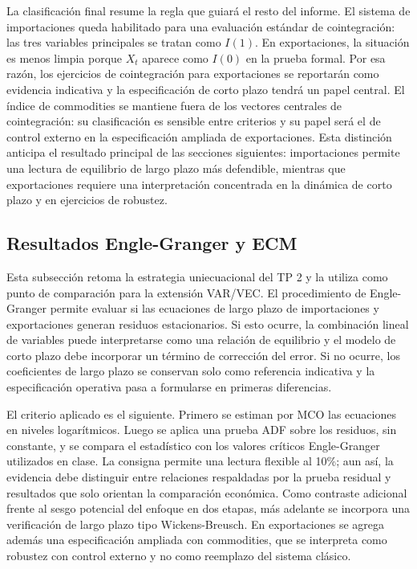 \documentclass[11pt,a4paper]{article}
\begin{document}
	La clasificación final resume la regla que guiará el resto del informe. El
	sistema de importaciones queda habilitado para una evaluación estándar de
	cointegración: las tres variables principales se tratan como \(I(1)\). En
	exportaciones, la situación es menos limpia porque \(X_t\) aparece como \(I(0)\)
	en la prueba formal. Por esa razón, los ejercicios de cointegración para
	exportaciones se reportarán como evidencia indicativa y la especificación de
	corto plazo tendrá un papel central. El índice de commodities se mantiene fuera
	de los vectores centrales de cointegración: su clasificación es sensible entre
	criterios y su papel será el de control externo en la especificación ampliada de
	exportaciones. Esta distinción anticipa el resultado principal de las secciones
	siguientes: importaciones permite una lectura de equilibrio de largo plazo más
	defendible, mientras que exportaciones requiere una interpretación concentrada
	en la dinámica de corto plazo y en ejercicios de robustez.
	
	\subsection{Resultados Engle-Granger y ECM}
	\label{subsec:resultados-eg-ecm}
	
	Esta subsección retoma la estrategia uniecuacional del TP 2 y la utiliza como
	punto de comparación para la extensión VAR/VEC. El procedimiento de
	Engle-Granger permite evaluar si las ecuaciones de largo plazo de importaciones
	y exportaciones generan residuos estacionarios. Si esto ocurre, la combinación
	lineal de variables puede interpretarse como una relación de equilibrio y el
	modelo de corto plazo debe incorporar un término de corrección del error. Si no
	ocurre, los coeficientes de largo plazo se conservan solo como referencia
	indicativa y la especificación operativa pasa a formularse en primeras
	diferencias.
	
	El criterio aplicado es el siguiente. Primero se estiman por MCO las ecuaciones
	en niveles logarítmicos. Luego se aplica una prueba ADF sobre los residuos, sin
	constante, y se compara el estadístico con los valores críticos
	Engle-Granger utilizados en clase. La consigna permite una lectura flexible al
	10\%; aun así, la evidencia debe distinguir entre relaciones respaldadas por la
	prueba residual y resultados que solo orientan la comparación económica. Como
	contraste adicional frente al sesgo potencial del enfoque en dos etapas, más
	adelante se incorpora una verificación de largo plazo tipo Wickens-Breusch. En
	exportaciones se agrega además una especificación ampliada con commodities, que
	se interpreta como robustez con control externo y no como reemplazo del sistema
	clásico.
	
\end{document}

